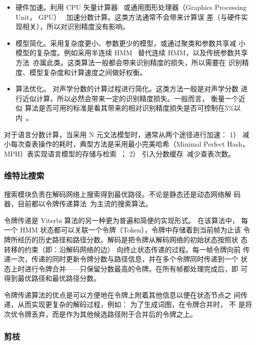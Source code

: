 \begin{itemize}
\item 硬件加速。利用 CPU 矢量计算器~\cite{kanthak2000using}
或通用图形处理器（Graphics
Processing Unit， GPU）~\cite{chong2009fully}
加速分数计算。这类方法通常不会带来计算误
差（与硬件实现相关），所以对识别精度没有影响。
\item 模型简化。采用复杂度更小、参数更少的模型，或通过聚类和参数共享减
小模型的复杂度。例如采用半连续 HMM~\cite{huang1990semi} 替代连续 HMM，以及传统参数共享方法~\cite{young2002htk}亦属此类。这类算法一般都会带来识别精度的损失，所以需要在
识别精度、模型复杂度和计算速度之间做好权衡。
\item 算法优化。 对声学分数的计算过程进行简化。这类方法一般是对声学分数
进行近似计算，所以必然会带来一定的识别精度损失。一般而言， 衡量一个近似
算法是否可用的标准是看其带来的相对识别精度损失是否可控制在5\%以内~\cite{cai2009efficient}。
\end{itemize}

对于语言分数计算，当采用 N 元文法模型时，通常从两个途径进行加速： 1）
减小每次查表操作的耗时，典型方法是采用最小完美哈希（Minimal Perfect Hash，
MPH）表实现语言模型的存储与检索~\cite{li2007fast,cardenal2002fast}； 2） 引入分数缓存~\cite{huijbregts2008fast}减少查表次数。

\subsubsection{维特比搜索}

搜索模块负责在解码网络上搜索得到最优路径。不论是静态还是动态网络解
码器，目前都以令牌传递算法~\cite{young1989token}为主流的搜索算法。

令牌传递是 Viterbi 算法的另一种更为普遍和简便的实现形式。 在该算法中，
每一个 HMM 状态都可以关联一个令牌（Token），令牌中存储着到当前帧为止该
令牌所经历的历史路径和路径分数。解码是把令牌从解码网络的初始状态按照状
态转移的约束（即：沿解码网络的边） 向终止状态传递的过程。每一帧令牌向前
传递一次，传递的同时更新令牌分数与路径信息，并在多个令牌同时传递到一个
状态上时进行令牌合并——只保留分数最高的令牌。在所有帧都处理完成后，即
可得到最优路径和最优路径分数。

令牌传递算法的优点是可以方便地在令牌上附着其他信息以便在状态节点之
间传递，从而实现更复杂的解码过程，例如： 为了生成词图，在令牌合并时， 不
是将次优令牌丢弃，而是作为其他候选路径附于合并后的令牌之上。

\subsubsection{剪枝}

